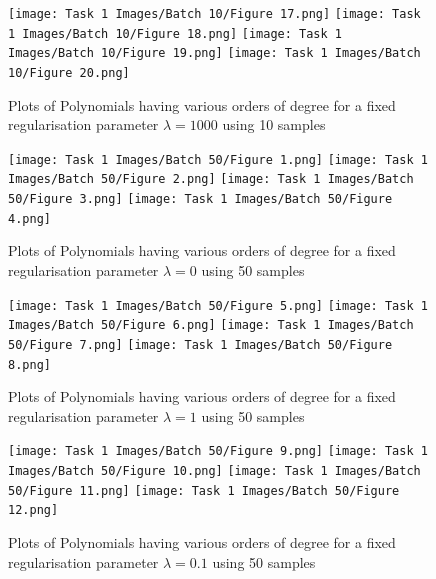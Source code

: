 \begin{figure}[p]
    \texttt{[image: Task 1 Images/Batch 10/Figure 17.png]}\hfill
    \texttt{[image: Task 1 Images/Batch 10/Figure 18.png]}\hfill
    \texttt{[image: Task 1 Images/Batch 10/Figure 19.png]}\hfill
    \texttt{[image: Task 1 Images/Batch 10/Figure 20.png]}
    \caption{Plots of Polynomials having various orders of degree for a fixed regularisation parameter $\lambda = 1000$ using 10 samples}
    \label{fig:5}
    \vspace*{\floatsep}
    
    \texttt{[image: Task 1 Images/Batch 50/Figure 1.png]}\hfill
    \texttt{[image: Task 1 Images/Batch 50/Figure 2.png]}\hfill
    \texttt{[image: Task 1 Images/Batch 50/Figure 3.png]}\hfill
    \texttt{[image: Task 1 Images/Batch 50/Figure 4.png]}
    \caption{Plots of Polynomials having various orders of degree for a fixed regularisation parameter $\lambda = 0$ using 50 samples}
    \label{fig:6}
    \vspace*{\floatsep}
    
    \texttt{[image: Task 1 Images/Batch 50/Figure 5.png]}\hfill
    \texttt{[image: Task 1 Images/Batch 50/Figure 6.png]}\hfill
    \texttt{[image: Task 1 Images/Batch 50/Figure 7.png]}\hfill
    \texttt{[image: Task 1 Images/Batch 50/Figure 8.png]}
    \caption{Plots of Polynomials having various orders of degree for a fixed regularisation parameter $\lambda = 1$ using 50 samples}
    \label{fig:7}
    \vspace*{\floatsep}
    
    \texttt{[image: Task 1 Images/Batch 50/Figure 9.png]}\hfill
    \texttt{[image: Task 1 Images/Batch 50/Figure 10.png]}\hfill
    \texttt{[image: Task 1 Images/Batch 50/Figure 11.png]}\hfill
    \texttt{[image: Task 1 Images/Batch 50/Figure 12.png]}
    \caption{Plots of Polynomials having various orders of degree for a fixed regularisation parameter $\lambda = 0.1$ using 50 samples}
    \label{fig:8}
\end{figure}

